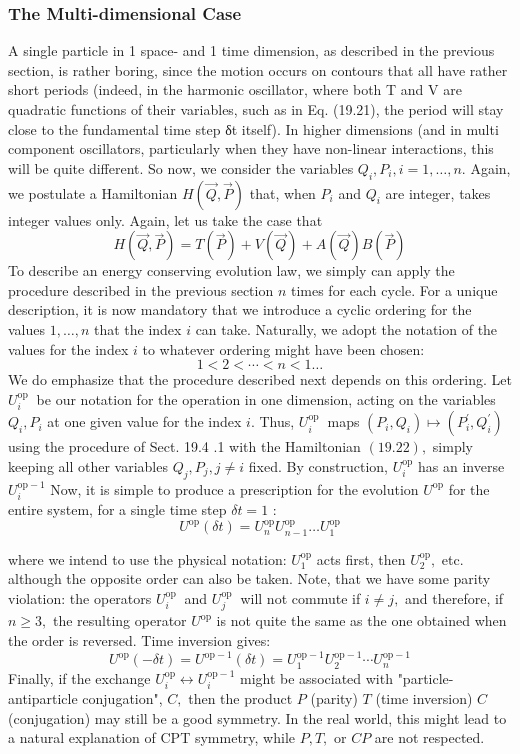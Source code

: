 \documentclass[main.tex]{subfiles}
\begin{document}
\subsubsection{The Multi-dimensional Case}\label{ch19.4.2}

A single particle in 1 space- and 1 time dimension, as described in the previous
section, is rather boring, since the motion occurs on contours that all have rather
short periods (indeed, in the harmonic oscillator, where both T and V are quadratic
functions of their variables, such as in Eq. (19.21), the period will stay close to
the fundamental time step δt itself). In higher dimensions (and in multi component oscillators, particularly when they have non-linear interactions, this will be quite different. So now, we consider the variables $Q_{i}, P_{i}, i=1, \ldots, n .$ Again, we postulate a Hamiltonian $H(\vec{Q}, \vec{P})$ that, when $P_{i}$ and $Q_{i}$ are integer, takes integer values only. Again, let us take the case that
$$
H(\vec{Q}, \vec{P})=T(\vec{P})+V(\vec{Q})+A(\vec{Q}) B(\vec{P})
$$
To describe an energy conserving evolution law, we simply can apply the procedure described in the previous section $n$ times for each cycle. For a unique description, it is now mandatory that we introduce a cyclic ordering for the values $1, \ldots, n$ that the index $i$ can take. Naturally, we adopt the notation of the values for the index $i$ to whatever ordering might have been chosen:
$$
1<2<\cdots<n<1 \ldots
$$
We do emphasize that the procedure described next depends on this ordering. Let $U_{i}^{\text {op }}$ be our notation for the operation in one dimension, acting on the variables $Q_{i}, P_{i}$ at one given value for the index $i .$ Thus, $U_{i}^{\text {op }}$ maps $\left(P_{i}, Q_{i}\right) \mapsto\left(P_{i}^{\prime}, Q_{i}^{\prime}\right)$ using the procedure of Sect. 19.4 .1 with the Hamiltonian $(19.22),$ simply keeping all other variables $Q_{j}, P_{j}, j \neq i$ fixed. By construction, $U_{i}^{\mathrm{op}}$ has an inverse $U_{i}^{\mathrm{op}-1}$ Now, it is simple to produce a prescription for the evolution $U^{\mathrm{op}}$ for the entire system, for a single time step $\delta t=1$ :
$$
U^{\mathrm{op}}(\delta t)=U_{n}^{\mathrm{op}} U_{n-1}^{\mathrm{op}} \ldots U_{1}^{\mathrm{op}}
$$

where we intend to use the physical notation: $U_{1}^{\mathrm{op}}$ acts first, then $U_{2}^{\mathrm{op}},$ etc. although the opposite order can also be taken. Note, that we have some parity violation: the operators $U_{i}^{\text {op }}$ and $U_{j}^{\text {op }}$ will not commute if $i \neq j,$ and therefore, if $n \geq 3,$ the resulting operator $U^{\mathrm{op}}$ is not quite the same as the one obtained when the order is reversed. Time inversion gives:
$$
U^{\mathrm{op}}(-\delta t)=U^{\mathrm{op}-1}(\delta t)=U_{1}^{\mathrm{op}-1} U_{2}^{\mathrm{op}-1} \cdots U_{n}^{\mathrm{op}-1}
$$
Finally, if the exchange $U_{i}^{\mathrm{op}} \leftrightarrow U_{i}^{\mathrm{op}-1}$ might be associated with "particle-antiparticle conjugation", $C,$ then the product $P$ (parity) $T$ (time inversion) $C$ (conjugation) may still be a good symmetry. In the real world, this might lead to a natural explanation of CPT symmetry, while $P, T,$ or $C P$ are not respected.
\end{document}
